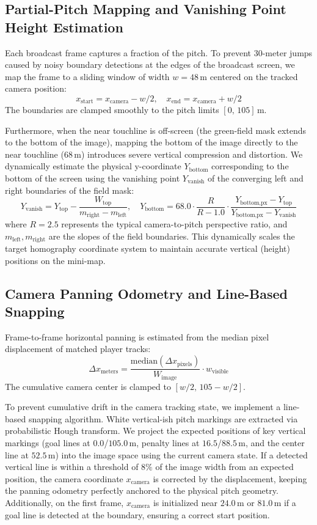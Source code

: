 \documentclass[11pt]{article}
\begin{document}
\subsection{Partial-Pitch Mapping and Vanishing Point Height Estimation}

Each broadcast frame captures a fraction of the pitch. To prevent 30-meter jumps caused by noisy boundary detections at the edges of the broadcast screen, we map the frame to a sliding window of width $w = 48\,$m centered on the tracked camera position:
\[
x_\text{start} = x_\text{camera} - w/2, \quad x_\text{end} = x_\text{camera} + w/2
\]
The boundaries are clamped smoothly to the pitch limits $[0, \, 105]\,$m. 

Furthermore, when the near touchline is off-screen (the green-field mask extends to the bottom of the image), mapping the bottom of the image directly to the near touchline ($68\,$m) introduces severe vertical compression and distortion. We dynamically estimate the physical y-coordinate $Y_\text{bottom}$ corresponding to the bottom of the screen using the vanishing point $Y_\text{vanish}$ of the converging left and right boundaries of the field mask:
\[
Y_\text{vanish} = Y_\text{top} - \frac{W_\text{top}}{m_\text{right} - m_\text{left}}, \quad Y_\text{bottom} = 68.0 \cdot \frac{R}{R - 1.0} \cdot \frac{Y_\text{bottom,px} - Y_\text{top}}{Y_\text{bottom,px} - Y_\text{vanish}}
\]
where $R = 2.5$ represents the typical camera-to-pitch perspective ratio, and $m_\text{left}, m_\text{right}$ are the slopes of the field boundaries. This dynamically scales the target homography coordinate system to maintain accurate vertical (height) positions on the mini-map.

\subsection{Camera Panning Odometry and Line-Based Snapping}

Frame-to-frame horizontal panning is estimated from the median pixel displacement of matched player tracks:
\[
\Delta x_\text{meters} = \frac{\text{median}(\Delta x_\text{pixels})}{W_\text{image}} \cdot w_\text{visible}
\]
The cumulative camera center is clamped to $[w/2, \, 105 - w/2]$. 

To prevent cumulative drift in the camera tracking state, we implement a line-based snapping algorithm. White vertical-ish pitch markings are extracted via probabilistic Hough transform. We project the expected positions of key vertical markings (goal lines at $0.0$/$105.0\,$m, penalty lines at $16.5$/$88.5\,$m, and the center line at $52.5\,$m) into the image space using the current camera state. If a detected vertical line is within a threshold of $8\%$ of the image width from an expected position, the camera coordinate $x_\text{camera}$ is corrected by the displacement, keeping the panning odometry perfectly anchored to the physical pitch geometry. Additionally, on the first frame, $x_\text{camera}$ is initialized near $24.0\,$m or $81.0\,$m if a goal line is detected at the boundary, ensuring a correct start position.
\end{document}
